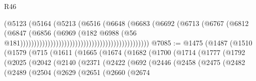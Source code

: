 \begin{lexlean}{R46}
\begin{coremodule}
                                                                    (@5123
                                                                      (@5164
                                                                        (@5213
                                                                          (@6516
                                                                            (@6648
                                                                              (@6683
                                                                                (@6692
                                                                                  (@6713
                                                                                    (@6767
                                                                                      (@6812
                                                                                        (@6847
                                                                                          (@6856
                                                                                            (@6969
                                                                                              (@182
                                                                                                @6988
                                                                                                (@56
                                                                                                  @181)))))))))))))))))))))))))))))))))))))))))))))))
@7085 := @1475
    (@1487
      (@1510
        (@1579
          (@715
            (@1611
              (@1665
                (@1674
                  (@1682
                    (@1700
                      (@1714
                        (@1777
                          (@1792
                            (@2025
                              (@2042
                                (@2140
                                  (@2371
                                    (@2422
                                      (@692
                                        (@2446
                                          (@2458
                                            (@2475
                                              (@2482
                                                (@2489
                                                  (@2504
                                                    (@2629
                                                      (@2651
                                                        (@2660
                                                          (@2674

\end{coremodule}
\end{lexlean}
